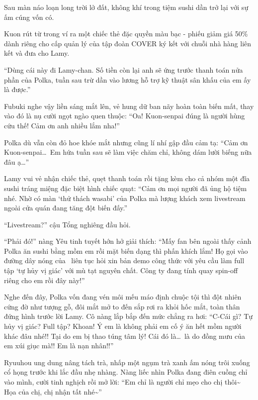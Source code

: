 \documentclass[../main.tex]{subfiles}
\begin{document}
\ct

Sau màn náo loạn long trời lở đất, không khí trong tiệm sushi dần trở lại với sự ấm cúng vốn có.

Kuon rút từ trong ví ra một chiếc thẻ đặc quyền màu bạc - phiếu giảm giá 50\% dành riêng cho cấp quản lý của tập đoàn COVER ký kết với chuỗi nhà hàng liên kết và đưa cho Lamy.

``Dùng cái này đi Lamy-chan. Số tiền còn lại anh sẽ ứng trước thanh toán nửa phần của Polka, tuần sau trừ dần vào lương hỗ trợ kỹ thuật sân khấu của em ấy là được.''

Fubuki nghe vậy liền sáng mắt lên, vẻ hung dữ ban nãy hoàn toàn biến mất, thay vào đó là nụ cười ngọt ngào quen thuộc: ``Oa! Kuon-senpai đúng là người hùng cứu thế! Cảm ơn anh nhiều lắm nha!''

Polka dù vẫn còn đỏ hoe khóe mắt nhưng cũng lí nhí gập đầu cảm tạ: ``Cảm ơn Kuon-senpai\dots\ Em hứa tuần sau sẽ làm việc chăm chỉ, không dám lười biếng nữa đâu ạ\dots''

Lamy vui vẻ nhận chiếc thẻ, quẹt thanh toán rồi tặng kèm cho cả nhóm một đĩa sushi tráng miệng đặc biệt hình chiếc quạt: ``Cảm ơn mọi người đã ủng hộ tiệm nhé. Nhờ có màn `thử thách wasabi' của Polka mà lượng khách xem livestream ngoài cửa quán đang tăng đột biến đấy.''

``Livestream?'' cậu Tổng nghiêng đầu hỏi.

``Phải đó!'' nàng Yêu tinh tuyết hớn hở giải thích: ``Mấy fan bên ngoài thấy cảnh Polka ăn sushi bằng mồm em rồi mặt biến dạng thì phấn khích lắm! Họ gọi vào đường dây nóng của \hll\ liên tục hỏi xin bản demo công thức với yêu cầu làm full tập `tự hủy vị giác' với mù tạt nguyên chất. Công ty đang tính quay spin-off riêng cho em rồi đây này!''

Nghe đến đây, Polka vốn đang vén môi mếu máo định chuộc tội thì đột nhiên cứng đờ như tượng gỗ, đôi mắt mở to đến sắp rơi ra khỏi hốc mắt, toàn thân đứng hình trước lời Lamy. Cô nàng lắp bắp đến mức chẳng ra hơi: ``C-Cái gì? Tự hủy vị giác? Full tập? Khoan! Ý em là không phải em cố ý ăn hết mồm người khác đâu nhé!! Tại do em bị thao túng tâm lý! Cái đó là\dots\ là do đồng mưu của em xúi giục mà!! Em là nạn nhân!!''

Ryuuhou ung dung nâng tách trà, nhấp một ngụm trà xanh ấm nóng trôi xuống cổ họng trước khi lắc đầu nhẹ nhàng. Nàng liếc nhìn Polka đang điên cuồng chỉ vào mình, cười tinh nghịch rồi mở lời: ``Em chỉ là người chỉ mẹo cho chị thôi\~{} Họa của chị, chị nhận tất nhé\~{}''
\end{document}
